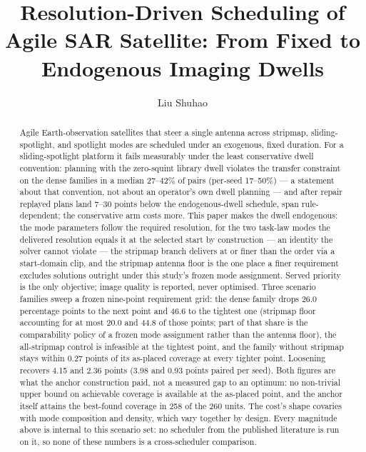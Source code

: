 \documentclass[preprint,authoryear]{elsarticle}
\begin{document}
\begin{frontmatter}
  \title{Resolution-Driven Scheduling of Agile SAR Satellite: From Fixed to Endogenous Imaging Dwells}
  \author{Liu Shuhao}

\begin{abstract}
Agile Earth-observation satellites that steer a single antenna across stripmap, sliding-spotlight, and spotlight modes are scheduled under an exogenous, fixed duration. For a sliding-spotlight platform it fails measurably under the least conservative dwell convention: planning with the zero-squint library dwell violates the transfer constraint on the dense families in a median 27--42\% of pairs (per-seed 17--50\%) --- a statement about that convention, not about an operator's own dwell planning --- and after repair replayed plans land 7--30 points below the endogenous-dwell schedule, span rule-dependent; the conservative arm costs more. This paper makes the dwell endogenous: the mode parameters follow the required resolution, for the two task-law modes the delivered resolution equals it at the selected start by construction --- an identity the solver cannot violate --- the stripmap branch delivers at or finer than the order via a start-domain clip, and the stripmap antenna floor is the one place a finer requirement excludes solutions outright under this study's frozen mode assignment. Served priority is the only objective; image quality is reported, never optimised. Three scenario families sweep a frozen nine-point requirement grid: the dense family drops 26.0 percentage points to the next point and 46.6 to the tightest one (stripmap floor accounting for at most 20.0 and 44.8 of those points; part of that share is the comparability policy of a frozen mode assignment rather than the antenna floor), the all-stripmap control is infeasible at the tightest point, and the family without stripmap stays within 0.27 points of its as-placed coverage at every tighter point. Loosening recovers 4.15 and 2.36 points (3.98 and 0.93 points paired per seed). Both figures are what the anchor construction paid, not a measured gap to an optimum: no non-trivial upper bound on achievable coverage is available at the as-placed point, and the anchor itself attains the best-found coverage in 258 of the 260 units. The cost's shape covaries with mode composition and density, which vary together by design. Every magnitude above is internal to this scenario set: no scheduler from the published literature is run on it, so none of these numbers is a cross-scheduler comparison.
\end{abstract}


\end{frontmatter}
\end{document}
